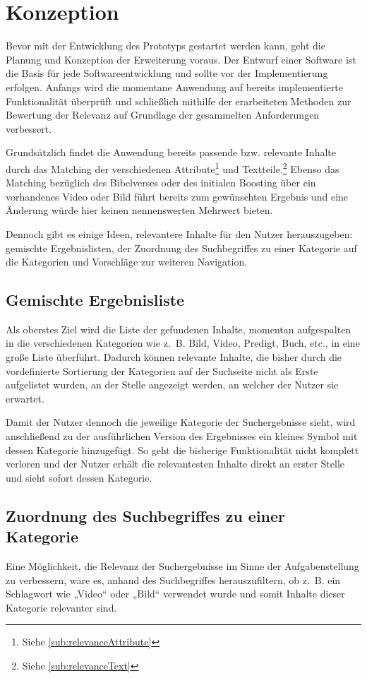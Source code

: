 \chapter{Konzeption}
\label{ch:conception}
Bevor mit der Entwicklung des Prototyps gestartet werden kann, geht die Planung und Konzeption der Erweiterung voraus.
Der Entwurf einer Software ist die Basis für jede Softwareentwicklung und sollte vor der Implementierung erfolgen.
Anfangs wird die momentane Anwendung auf bereits implementierte Funktionalität überprüft und schließlich mithilfe der erarbeiteten Methoden zur Bewertung der Relevanz auf Grundlage der gesammelten Anforderungen verbessert.

Grundsätzlich findet die Anwendung bereits passende bzw. relevante Inhalte durch das Matching der verschiedenen Attribute\footnote{Siehe \ref{sub:relevanceAttribute}} und Textteile.\footnote{Siehe \ref{sub:relevanceText}}
Ebenso das Matching bezüglich des Bibelverses oder des initialen Boosting über ein vorhandenes Video oder Bild führt bereits zum gewünschten Ergebnis und eine Änderung würde hier keinen nennenswerten Mehrwert bieten.

Dennoch gibt es einige Ideen, relevantere Inhalte für den Nutzer herauszugeben: gemischte Ergebnislisten, der Zuordnung des Suchbegriffes zu einer Kategorie auf die Kategorien und Vorschläge zur weiteren Navigation.

\section{Gemischte Ergebnisliste}
\label{sub:unifiedList}
Als oberstes Ziel wird die Liste der gefundenen Inhalte, momentan aufgespalten in die verschiedenen Kategorien wie z. B. Bild, Video, Predigt, Buch, etc., in eine große Liste überführt.
Dadurch können relevante Inhalte, die bisher durch die vordefinierte Sortierung der Kategorien auf der Suchseite nicht als Erste aufgelistet wurden, an der Stelle angezeigt werden, an welcher der Nutzer sie erwartet.

Damit der Nutzer dennoch die jeweilige Kategorie der Suchergebnisse sieht, wird anschließend zu der ausführlichen Version des Ergebnisses ein kleines Symbol mit dessen Kategorie hinzugefügt.
So geht die bisherige Funktionalität nicht komplett verloren und der Nutzer erhält die relevantesten Inhalte direkt an erster Stelle und sieht sofort dessen Kategorie.

\section{Zuordnung des Suchbegriffes zu einer Kategorie}
\label{sub:keyword}
Eine Möglichkeit, die Relevanz der Suchergebnisse im Sinne der Aufgabenstellung zu verbessern, wäre es, anhand des Suchbegriffes herauszufiltern, ob z. B. ein Schlagwort wie „Video“ oder „Bild“ verwendet wurde und somit Inhalte dieser Kategorie relevanter sind.

